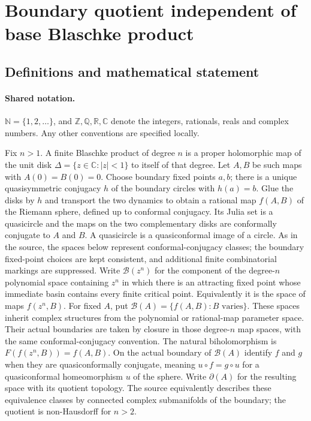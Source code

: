 \documentclass[11pt]{article}
\begin{document}
\section{Boundary quotient independent of base Blaschke product}\label{statement}

\subsection{Definitions and mathematical statement}

\paragraph{Shared notation.}$\mathbb N=\{1,2,\ldots\}$, and $\mathbb Z,\mathbb Q,\mathbb R,\mathbb C$ denote the integers, rationals, reals and complex numbers. Any other conventions are specified locally.


Fix $n>1$. A finite Blaschke product of degree $n$ is a proper holomorphic map of the unit disk $\Delta=\{z\in\mathbb C:|z|<1\}$ to itself of that degree. Let $A,B$ be such maps with $A(0)=B(0)=0$. Choose boundary fixed points $a,b$; there is a unique quasisymmetric conjugacy $h$ of the boundary circles with $h(a)=b$. Glue the disks by $h$ and transport the two dynamics to obtain a rational map $f(A,B)$ of the Riemann sphere, defined up to conformal conjugacy. Its Julia set is a quasicircle and the maps on the two complementary disks are conformally conjugate to $A$ and $B$. A quasicircle is a quasiconformal image of a circle. As in the source, the spaces below represent conformal-conjugacy classes; the boundary fixed-point choices are kept consistent, and additional finite combinatorial markings are suppressed.
Write $\mathcal B(z^n)$ for the component of the degree-$n$ polynomial space containing $z^n$ in which there is an attracting fixed point whose immediate basin contains every finite critical point. Equivalently it is the space of maps $f(z^n,B)$. For fixed $A$, put $\mathcal B(A)=\{f(A,B):B\text{ varies}\}$. These spaces inherit complex structures from the polynomial or rational-map parameter space. Their actual boundaries are taken by closure in those degree-$n$ map spaces, with the same conformal-conjugacy convention. The natural biholomorphism is $F(f(z^n,B))=f(A,B)$.
On the actual boundary of $\mathcal B(A)$ identify $f$ and $g$ when they are quasiconformally conjugate, meaning $u\circ f=g\circ u$ for a quasiconformal homeomorphism $u$ of the sphere. Write $\partial(A)$ for the resulting space with its quotient topology. The source equivalently describes these equivalence classes by connected complex submanifolds of the boundary; the quotient is non-Hausdorff for $n>2$.
\end{document}
